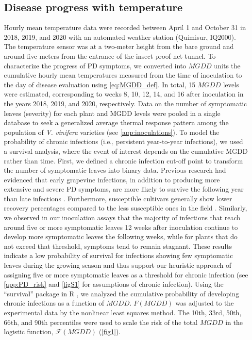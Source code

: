 \subsection{Disease progress with temperature}

Hourly mean temperature data were recorded between April 1 and October 31 in
2018, 2019, and 2020 with an automated weather station (Quimisur, IQ2000). The
temperature sensor was at a two-meter height from the bare ground and around
five meters from the entrance of the insect-proof net tunnel. To characterize
the progress of PD symptoms, we converted into $MGDD$ units the cumulative
hourly mean temperatures measured from the time of inoculation to the day of
disease evaluation using \cref{eq:MGDD_def}. In total, 15 $MGDD$ levels were
estimated, corresponding to weeks 8, 10, 12, 14, and 16 after inoculation in
the years 2018, 2019, and 2020, respectively. Data on the number of symptomatic
leaves (severity) for each plant and MGDD levels were pooled in a single
database to seek a generalized average thermal response pattern among the
population of \textit{V. vinifera} varieties (see \cref{app:inoculations}). To
model the probability of chronic infections (i.e., persistent year-to-year
infections), we used a survival analysis, where the event of interest depends
on the cumulative MGDD rather than time. First, we defined a chronic infection
cut-off point to transform the number of symptomatic leaves into binary data.
Previous research had evidenced that early grapevine infections, in addition to
producing more extensive and severe PD symptoms, are more likely to survive the
following year than late infections \cite{Feil2001, Feil2003, Lieth2011}.
Furthermore, susceptible cultivars generally show lower recovery percentages
compared to the less susceptible ones in the field
\cite{purcell1974spatial,purcell1981vector}. Similarly, we observed in our
inoculation assays that the majority of infections that reach around five or
more symptomatic leaves 12 weeks after inoculation continue to develop more
symptomatic leaves the following weeks, while for plants that do not exceed
that threshold, symptoms tend to remain stagnant. These results indicate a low
probability of survival for infections showing few symptomatic leaves during
the growing season and thus support our heuristic approach of assigning five or
more symptomatic leaves as a threshold for chronic infection (see
\cref{app:PD_risk} and \cref{figS1} for assumptions of chronic infection).
Using the ``survival'' package in R \cite{survival-package}, we analyzed the
cumulative probability of developing chronic infections as a function of
$MGDD$. $F(MGDD)$ was adjusted to the experimental data by the nonlinear least
squares method. The 10th, 33rd, 50th, 66th, and 90th percentiles were used to
scale the risk of the total $MGDD$ in the logistic function,
$\mathcal{F}(MGDD)$ (\cref{fig1}).

